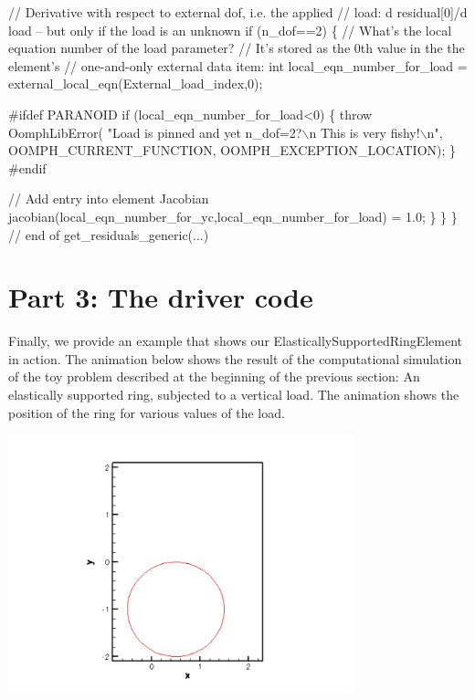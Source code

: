 \begin{DoxyCodeInclude}
     
     \textcolor{comment}{// Derivative with respect to external dof, i.e. the applied }
     \textcolor{comment}{// load: d residual[0]/d load -- but only if the load is an unknown}
     \textcolor{keywordflow}{if} (n\_dof==2)
      \{
       \textcolor{comment}{// What's the local equation number of the load parameter?}
       \textcolor{comment}{// It's stored as the 0th value in the the element's}
       \textcolor{comment}{// one-and-only external data item:}
       \textcolor{keywordtype}{int} local\_eqn\_number\_for\_load = 
        external\_local\_eqn(External\_load\_index,0);

\textcolor{preprocessor}{#ifdef PARANOID}
       \textcolor{keywordflow}{if} (local\_eqn\_number\_for\_load<0)
        \{
         \textcolor{keywordflow}{throw} OomphLibError(
          \textcolor{stringliteral}{"Load is pinned and yet n\_dof=2?\(\backslash\)n This is very fishy!\(\backslash\)n"},
          OOMPH\_CURRENT\_FUNCTION,
          OOMPH\_EXCEPTION\_LOCATION);
        \}
\textcolor{preprocessor}{#endif}
         
       \textcolor{comment}{// Add entry into element Jacobian}
       jacobian(local\_eqn\_number\_for\_yc,local\_eqn\_number\_for\_load) = 1.0;
      \}
    \}
  \} \textcolor{comment}{// end of get\_residuals\_generic(...)}

\end{DoxyCodeInclude}




 

\hypertarget{index_driver}{}\section{Part 3\+: The driver code}\label{index_driver}
Finally, we provide an example that shows our {\ttfamily Elastically\+Supported\+Ring\+Element} in action. The animation below shows the result of the computational simulation of the toy problem described at the beginning of the previous section\+: An elastically supported ring, subjected to a vertical load. The animation shows the position of the ring for various values of the load.

 
\begin{DoxyImage}
\includegraphics[width=0.75\textwidth]{circle_as_element}
\end{DoxyImage}




